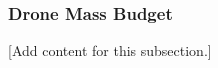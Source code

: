 
\subsubsection{Drone Mass Budget}
\label{subsubsec:design_6_1_drone_mass_budget}

[Add content for this subsection.]
